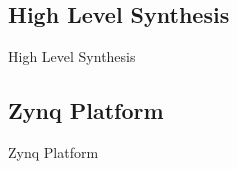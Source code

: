\subsection{High Level Synthesis}
\begin{frame}[label=hls]{High Level Synthesis}
\end{frame}

\subsection{Zynq Platform}
\begin{frame}[label=zynq]{Zynq Platform}
\end{frame}
